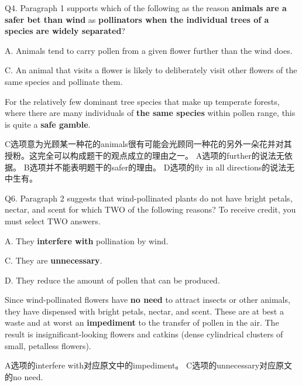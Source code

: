 \begin{blk}
    \begin{qst}
        Q4. Paragraph 1 supports which of the following as the reason \textbf{animals are a safer bet than wind} as \textbf{pollinators when the individual trees of a species are widely separated}?
    \end{qst}

    \begin{chc}
        A. Animals tend to carry pollen from a given flower further than the wind does.

        C. An animal that visits a flower is likely to deliberately visit other flowers of the same species and pollinate them.
    \end{chc}

    \begin{psgq}
        For the relatively few dominant tree species that make up temperate forests, where there are many individuals of \textbf{the same species} within pollen range, this is quite a \textbf{safe gamble}.
    \end{psgq}

    \begin{nlz}
        C选项意为光顾某一种花的animals很有可能会光顾同一种花的另外一朵花并对其授粉。这完全可以构成题干的观点成立的理由之一。 A选项的further的说法无依据。 B选项并不能表明题干的safer的理由。 D选项的fly in all directions的说法无中生有。
    \end{nlz}
\end{blk}

\begin{blk}
    \begin{qst}
        Q6. Paragraph 2 suggests that wind-pollinated plants do not have bright petals, nectar, and scent for which TWO of the following reasons? To receive credit, you must select TWO answers.
    \end{qst}

    \begin{chc}
        A. They \textbf{interfere with} pollination by wind.

        C. They are \textbf{unnecessary}.

        D. They reduce the amount of pollen that can be produced.
    \end{chc}

    \begin{psgq}
        Since wind-pollinated flowers have \textbf{no need} to attract insects or other animals, they have dispensed with bright petals, nectar, and scent. These are at best a waste and at worst an \textbf{impediment} to the transfer of pollen in the air. The result is insignificant-looking flowers and catkins (dense cylindrical clusters of small, petalless flowers).
    \end{psgq}

    \begin{nlz}
        A选项的interfere with对应原文中的impediment。 C选项的unnecessary对应原文的no need.
    \end{nlz}
\end{blk}
